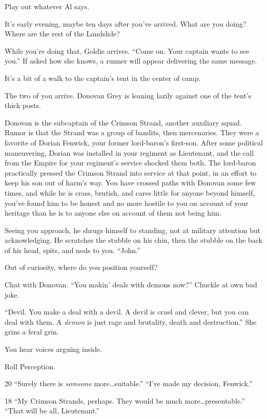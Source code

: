 \begin{multicols}{2}
Play out whatever Al says.

\hlinefill

It's early evening, maybe ten days after you've arrived.
What are you doing?
Where are the rest of the Landslide?

While you're doing that, Goldie arrives.
``Come on.
  Your captain wants to see you.''
If asked how she knows, a runner will appear delivering the same message.

It's a bit of a walk to the captain's tent in the center of camp.

The two of you arrive.
Donovan Grey is leaning lazily against one of the tent's thick posts.

Donovan is the subcaptain of the Crimson Strand, another auxiliary squad.
Rumor is that the Strand was a group of bandits, then mercenaries.
They were a favorite of Dorian Fenwick, your former lord-baron's first-son.
After some political maneuvering, Dorian was installed in your regiment as Lieutenant,
  and the call from the Empire for your regiment's service shocked them both.
The lord-baron practically pressed the Crimson Strand into service at that point, in an effort to
  keep his son out of harm's way.
You have crossed paths with Donovan some few times, and while he is crass, brutish, and
  cares little for anyone beyond himself, you've found him to be honest and no more hostile to you
  on account of your heritage than he is to anyone else on account of them not being him.

Seeing you approach, he shrugs himself to standing, not at military attention but acknowledging.
He scratches the stubble on his chin, then the stubble on the back of his head, spits,
  and nods to you.
``John.''

Out of curiosity, where do you position yourself?

Chat with Donovan.
``You makin' deals with demons now?''
Chuckle at own bad joke.

``Devil.
  You make a deal with a devil.
  A devil is cruel and clever, but you can deal with them.
  A \emph{demon} is just rage and brutality, death and destruction.''
She grins a feral grin.

You hear voices arguing inside.

Roll Perception.

20
``Surely there is \emph{someone} more\dots suitable.''
``I've made my decision, Fenwick.''

18
``My Crimson Strands, perhaps.
  They would be much more\dots presentable.''
``That will be all, Lieutenant.''


\end{multicols}
